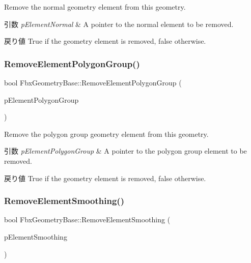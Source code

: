 Remove the normal geometry element from this geometry. 
\begin{DoxyParams}{引数}
{\em p\+Element\+Normal} & A pointer to the normal element to be removed. \\
\hline
\end{DoxyParams}
\begin{DoxyReturn}{戻り値}
{\ttfamily True} if the geometry element is removed, {\ttfamily false} otherwise. 
\end{DoxyReturn}
\mbox{\label{class_fbx_geometry_base_a0746664cececc19040a011ddbc7c7623}} 
\subsubsection{\texorpdfstring{Remove\+Element\+Polygon\+Group()}{RemoveElementPolygonGroup()}}
{\footnotesize\ttfamily bool Fbx\+Geometry\+Base\+::\+Remove\+Element\+Polygon\+Group (\begin{DoxyParamCaption}\item[{\hyperlink{fbxlayer_8h_aa5c7fb92a1c396014bf2ced7797a95a9}{Fbx\+Geometry\+Element\+Polygon\+Group} $\ast$}]{p\+Element\+Polygon\+Group }\end{DoxyParamCaption})}

Remove the polygon group geometry element from this geometry. 
\begin{DoxyParams}{引数}
{\em p\+Element\+Polygon\+Group} & A pointer to the polygon group element to be removed. \\
\hline
\end{DoxyParams}
\begin{DoxyReturn}{戻り値}
{\ttfamily True} if the geometry element is removed, {\ttfamily false} otherwise. 
\end{DoxyReturn}
\mbox{\label{class_fbx_geometry_base_a55da601b539c3e1c933fb1b3f053e1ca}} 
\subsubsection{\texorpdfstring{Remove\+Element\+Smoothing()}{RemoveElementSmoothing()}}
{\footnotesize\ttfamily bool Fbx\+Geometry\+Base\+::\+Remove\+Element\+Smoothing (\begin{DoxyParamCaption}\item[{\hyperlink{fbxlayer_8h_a6a651170dec994ac83db90645d9ecfd3}{Fbx\+Geometry\+Element\+Smoothing} $\ast$}]{p\+Element\+Smoothing }\end{DoxyParamCaption})}

